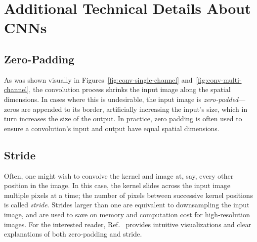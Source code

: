 \documentclass[11pt, a4paper]{article}
\begin{document}
\section{Additional Technical Details About CNNs} \label{s:appendix-cnn}

\subsection{Zero-Padding}
As was shown visually in Figures~\ref{fig:conv-single-channel} and~\ref{fig:conv-multi-channel}, the convolution process shrinks the input image along the spatial dimensions.
In cases where this is undesirable, the input image is \textit{zero-padded}---zeros are appended to its border, artificially increasing the input's size, which in turn increases the size of the output.
In practice, zero padding is often used to ensure a convolution's input and output have equal spatial dimensions.



\subsection{Stride}
Often, one might wish to convolve the kernel and image at, say, every other position in the image.
In this case, the kernel slides across the input image multiple pixels at a time; the number of pixels between successive kernel positions is called \textit{stride}.
Strides larger than one are equivalent to downsampling the input image, and are used to save on memory and computation cost for high-resolution images.
For the interested reader, Ref.~\cite{cnn-guide} provides intuitive visualizations and clear explanations of both zero-padding and stride.
\end{document}
